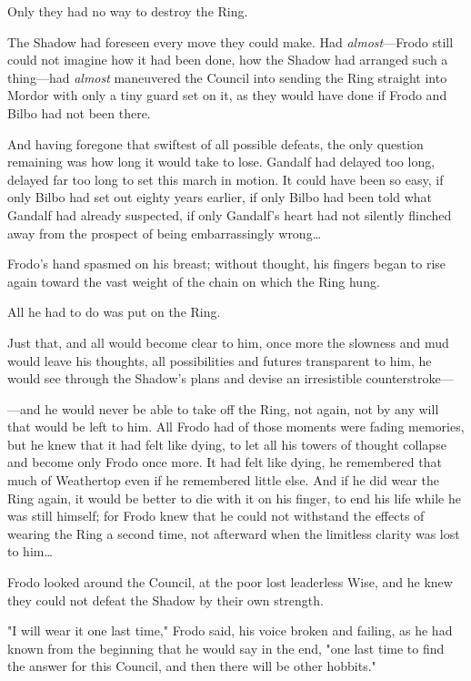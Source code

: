 Only they had no way to destroy the Ring.

The Shadow had foreseen every move they could make. Had \emph{almost}---Frodo 
still could not imagine how it had been done, how the Shadow had arranged such 
a thing---had \emph{almost} maneuvered the Council into sending the Ring 
straight into Mordor with only a tiny guard set on it, as they would have done 
if Frodo and Bilbo had not been there.

And having foregone that swiftest of all possible defeats, the only question 
remaining was how long it would take to lose. Gandalf had delayed too long, 
delayed far too long to set this march in motion. It could have been so easy, 
if only Bilbo had set out eighty years earlier, if only Bilbo had been told 
what Gandalf had already suspected, if only Gandalf's heart had not silently 
flinched away from the prospect of being embarrassingly wrong{\ldots}

Frodo's hand spasmed on his breast; without thought, his fingers began to rise 
again toward the vast weight of the chain on which the Ring hung.

All he had to do was put on the Ring.

Just that, and all would become clear to him, once more the slowness and mud 
would leave his thoughts, all possibilities and futures transparent to him, he 
would see through the Shadow's plans and devise an irresistible counterstroke---

---and he would never be able to take off the Ring, not again, not by any will 
that would be left to him. All Frodo had of those moments were fading memories, 
but he knew that it had felt like dying, to let all his towers of thought 
collapse and become only Frodo once more. It had felt like dying, he remembered 
that much of Weathertop even if he remembered little else. And if he did wear 
the Ring again, it would be better to die with it on his finger, to end his 
life while he was still himself; for Frodo knew that he could not withstand the 
effects of wearing the Ring a second time, not afterward when the limitless 
clarity was lost to him{\ldots}

Frodo looked around the Council, at the poor lost leaderless Wise, and he knew 
they could not defeat the Shadow by their own strength.

"I will wear it one last time," Frodo said, his voice broken and failing, as he 
had known from the beginning that he would say in the end, "one last time to 
find the answer for this Council, and then there will be other hobbits."

